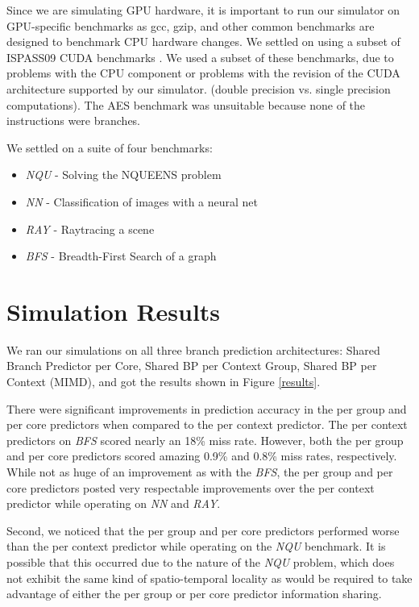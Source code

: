 \documentclass[conference]{IEEEtran}
\begin{document}
Since we are simulating GPU hardware, it is important to run our simulator on GPU-specific benchmarks as gcc, gzip, and other common benchmarks are designed to benchmark CPU hardware changes.  We settled on using a subset of ISPASS09 CUDA benchmarks \cite{ispass09}.  We used a subset of these benchmarks, due to problems with the CPU component or problems with the revision of the CUDA architecture supported by our simulator. (double precision vs. single precision computations).  The AES benchmark was unsuitable because none of the instructions were branches.

We settled on a suite of four benchmarks:

\begin{itemize}
	\item \emph{NQU} - Solving the NQUEENS problem
	\item \emph{NN} - Classification of images with a neural net
	\item \emph{RAY} - Raytracing a scene
	\item \emph{BFS} - Breadth-First Search of a graph
\end{itemize}

\section{Simulation Results}

We ran our simulations on all three branch prediction architectures: Shared Branch Predictor per Core, Shared BP per Context Group, Shared BP per Context (MIMD), and got the results shown in Figure \ref{results}.

There were significant improvements in prediction accuracy in the per group and per core predictors when compared to the per context predictor.  The per context predictors on \emph{BFS} scored nearly an 18\% miss rate.  However, both the per group and per core predictors scored amazing 0.9\% and 0.8\% miss rates, respectively.  While not as huge of an improvement as with the \emph{BFS}, the per group and per core predictors posted very respectable improvements over the per context predictor while operating on \emph{NN} and \emph{RAY}.

Second, we noticed that the per group and per core predictors performed worse than the per context predictor while operating on the \emph{NQU} benchmark.  It is possible that this occurred due to the nature of the \emph{NQU} problem, which does not exhibit the same kind of spatio-temporal locality as would be required to take advantage of either the per group or per core predictor information sharing.
\end{document}
